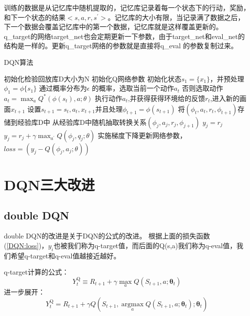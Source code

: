 训练的数据是从记忆库中随机提取的，记忆库记录着每一个状态下的行动，奖励，和下一个状态的结果$<s, a, r, s^{'}>$。记忆库的大小有限，当记录满了数据之后，下一个数据会覆盖记忆库中的第一个数据，记忆库就是这样覆盖更新的。
q\_target的网络target\_net也会定期更新一下参数，由于target\_net和eval\_net的结构是一样的。更新q\_target网络的参数就是直接将q\_eval 的参数复制过来。
\cleardoublepage
\begin{algorithm}
  \caption{DQN算法}
  \begin{algorithmic}
    \State 初始化检验回放库D大小为N
    \State 初始化Q网络参数
    初始化状态$s_1=\{x_1\}$，并预处理$\phi_1=\phi\{s_1\}$
    \State 通过概率分布为$\epsilon$ 的概率，选取当前一个动作$a_t$
    \State 否则选取动作$a_t=\max_a Q^* (\phi(s_t),a;\theta)$
    \State 执行动作$a_t$,并获得获得环境给的反馈$r_t$,进入新的画面$x_{t+1}$
    \State 设置$s_{t+1}=s_t,a_t,x_{t+1}$并且处理$\phi_{t+1}=\phi(s_{t+1})$
    \State 将$(\phi_t,a_t,r_t,\phi_{t+1})$存储到经验库D中
    \State 从经验库D中随机抽取转换关系$(\phi_j,a_j,r_j,\phi_{j+1})$
    \State $y_j=r_j$
    \Else
    \State $y_j=r_j+\gamma \max_{a^{'}}Q(\phi_j,q_j;\theta)$
    \EndIf
    \State 实施梯度下降更新网络参数，$loss=(y_j-Q(\phi_j,a_j;\theta))$
    \EndFor
    \EndFor
  \end{algorithmic}
\end{algorithm}

\section{DQN三大改进}
\subsection{double DQN}
double DQN\cite{van2016deep,hasselt2010double}的改进是关于DQN的公式的改进。
根据上面的损失函数(\ref{DQN:loss})，$y_i$也被我们称为q-target值，而后面的Q(s,a)我们称为q-eval值，我们希望q-target和q-eval值越接近越好。

q-target计算的公式：
\begin{equation}
  Y_{t}^{\mathrm{Q}} \equiv R_{t+1}+\gamma \max _{a} Q\left(S_{t+1}, a ; \boldsymbol{\theta}_{t}\right)
\end{equation}
进一步展开：
\begin{equation}
  Y_{t}^{\mathrm{Q}}=R_{t+1}+\gamma Q\left(S_{t+1}, \underset{a}{\operatorname{argmax}} Q\left(S_{t+1}, a ; \boldsymbol{\theta}_{t}\right) ; \boldsymbol{\theta}_{t}\right)
\end{equation}

